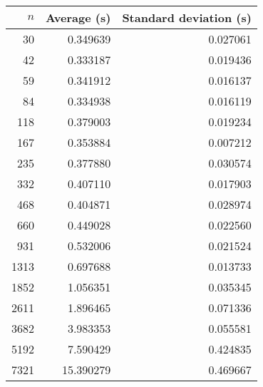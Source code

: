 \begin{tabular}{rrr}
$n$ & Average (s) & Standard deviation (s)\\\hline
30 & 0.349639 & 0.027061\\
42 & 0.333187 & 0.019436\\
59 & 0.341912 & 0.016137\\
84 & 0.334938 & 0.016119\\
118 & 0.379003 & 0.019234\\
167 & 0.353884 & 0.007212\\
235 & 0.377880 & 0.030574\\
332 & 0.407110 & 0.017903\\
468 & 0.404871 & 0.028974\\
660 & 0.449028 & 0.022560\\
931 & 0.532006 & 0.021524\\
1313 & 0.697688 & 0.013733\\
1852 & 1.056351 & 0.035345\\
2611 & 1.896465 & 0.071336\\
3682 & 3.983353 & 0.055581\\
5192 & 7.590429 & 0.424835\\
7321 & 15.390279 & 0.469667\\
\end{tabular}
